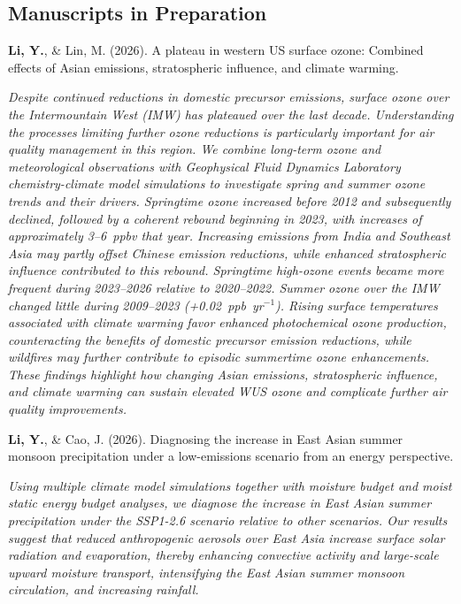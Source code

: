 \documentclass[11pt,a4paper]{article}
\newcommand{\publication}[1]{%
  \Needspace{4\baselineskip}
  \par\noindent #1\par
}
\newcommand{\researchsummary}[1]{%
  {\itshape #1\par}\vspace{4pt}
}
\begin{document}
\subsection*{Manuscripts in Preparation}

\publication{\textbf{Li, Y.}, \& Lin, M. (2026). A plateau in western US surface ozone: Combined effects of Asian emissions, stratospheric influence, and climate warming.}

\researchsummary{Despite continued reductions in domestic precursor emissions, surface ozone over the Intermountain West (IMW) has plateaued over the last decade. Understanding the processes limiting further ozone reductions is particularly important for air quality management in this region. We combine long-term ozone and meteorological observations with Geophysical Fluid Dynamics Laboratory chemistry-climate model simulations to investigate spring and summer ozone trends and their drivers. Springtime ozone increased before 2012 and subsequently declined, followed by a coherent rebound beginning in 2023, with increases of approximately 3--6~ppbv that year. Increasing emissions from India and Southeast Asia may partly offset Chinese emission reductions, while enhanced stratospheric influence contributed to this rebound. Springtime high-ozone events became more frequent during 2023--2026 relative to 2020--2022. Summer ozone over the IMW changed little during 2009--2023 (+0.02~ppb~yr$^{-1}$). Rising surface temperatures associated with climate warming favor enhanced photochemical ozone production, counteracting the benefits of domestic precursor emission reductions, while wildfires may further contribute to episodic summertime ozone enhancements. These findings highlight how changing Asian emissions, stratospheric influence, and climate warming can sustain elevated WUS ozone and complicate further air quality improvements.}

\publication{\textbf{Li, Y.}, \& Cao, J. (2026). Diagnosing the increase in East Asian summer monsoon precipitation under a low-emissions scenario from an energy perspective.}

\researchsummary{Using multiple climate model simulations together with moisture budget and moist static energy budget analyses, we diagnose the increase in East Asian summer precipitation under the SSP1-2.6 scenario relative to other scenarios. Our results suggest that reduced anthropogenic aerosols over East Asia increase surface solar radiation and evaporation, thereby enhancing convective activity and large-scale upward moisture transport, intensifying the East Asian summer monsoon circulation, and increasing rainfall.}
\end{document}
